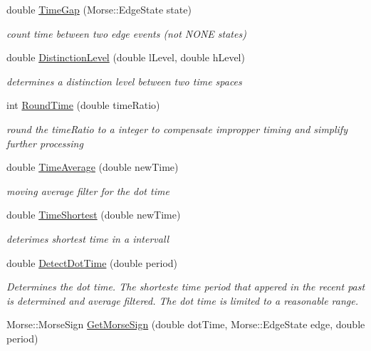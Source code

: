 \begin{DoxyCompactItemize}
double \hyperlink{classMorseDecode_a90f76d35c56413f35f59fa88e4c0a95c}{Time\+Gap} (Morse\+::\+Edge\+State state)
\begin{DoxyCompactList}\small\item\em count time between two edge events (not N\+O\+NE states) \end{DoxyCompactList}\item 
double \hyperlink{classMorseDecode_a5a23bce21e6da60ae14a657096cd1e00}{Distinction\+Level} (double l\+Level, double h\+Level)
\begin{DoxyCompactList}\small\item\em determines a distinction level between two time spaces \end{DoxyCompactList}\item 
int \hyperlink{classMorseDecode_ad1f577a49ff5d8f4face188dba8966c7}{Round\+Time} (double time\+Ratio)
\begin{DoxyCompactList}\small\item\em round the time\+Ratio to a integer to compensate impropper timing and simplify further processing \end{DoxyCompactList}\item 
double \hyperlink{classMorseDecode_a40976ef94b368d713808e26cefd2ea60}{Time\+Average} (double new\+Time)
\begin{DoxyCompactList}\small\item\em moving average filter for the dot time \end{DoxyCompactList}\item 
double \hyperlink{classMorseDecode_afd5655c1ea13e9ea09bdc25ef9d0bece}{Time\+Shortest} (double new\+Time)
\begin{DoxyCompactList}\small\item\em deterimes shortest time in a intervall \end{DoxyCompactList}\item 
double \hyperlink{classMorseDecode_ae7a9b7844ed145918d91b6ec7337d7c2}{Detect\+Dot\+Time} (double period)
\begin{DoxyCompactList}\small\item\em Determines the dot time. The shorteste time period that appered in the recent past is determined and average filtered. The dot time is limited to a reasonable range. \end{DoxyCompactList}\item 
Morse\+::\+Morse\+Sign \hyperlink{classMorseDecode_aff88997ef0a7621027bab01be18473a0}{Get\+Morse\+Sign} (double dot\+Time, Morse\+::\+Edge\+State edge, double period)

\end{DoxyCompactItemize}
